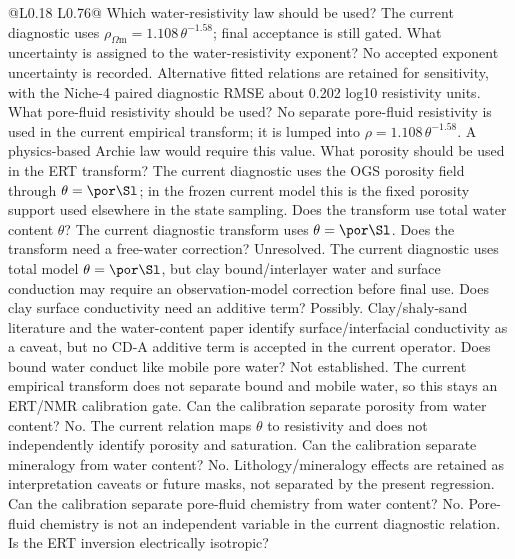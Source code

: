 \begin{longtable}{@{}L{0.18\textwidth} L{0.76\textwidth}@{}}
{ Which water-resistivity law should be used?}
{The current diagnostic uses \(\rho_{\Omega\mathrm{m}}=1.108\,\theta^{-1.58}\);
final acceptance is still gated.}
{ What uncertainty is assigned to the water-resistivity exponent?}
{No accepted exponent uncertainty is recorded.  Alternative fitted relations are
retained for sensitivity, with the Niche-4 paired diagnostic RMSE about 0.202 log10
resistivity units.}
{ What pore-fluid resistivity should be used?}
{No separate pore-fluid resistivity is used in the current empirical transform; it is
lumped into \(\rho=1.108\,\theta^{-1.58}\).  A physics-based Archie law would require
this value.}
{ What porosity should be used in the ERT transform?}
{The current diagnostic uses the OGS porosity field through
\(\theta=\por\Sl\); in the frozen current model this is the fixed porosity support
used elsewhere in the state sampling.}
{ Does the transform use total water content \(\theta\)?}
{The current diagnostic transform uses \(\theta=\por\Sl\).}
{ Does the transform need a free-water correction?}
{Unresolved.  The current diagnostic uses total model \(\theta=\por\Sl\), but clay
bound/interlayer water and surface conduction may require an observation-model
correction before final use.}
{ Does clay surface conductivity need an additive term?}
{Possibly.  Clay/shaly-sand literature and the water-content paper identify
surface/interfacial conductivity as a caveat, but no CD-A additive term is accepted
in the current operator.}
{ Does bound water conduct like mobile pore water?}
{Not established.  The current empirical transform does not separate bound and mobile
water, so this stays an ERT/NMR calibration gate.}
{ Can the calibration separate porosity from water content?}
{No.  The current relation maps \(\theta\) to resistivity and does not independently
identify porosity and saturation.}
{ Can the calibration separate mineralogy from water content?}
{No.  Lithology/mineralogy effects are retained as interpretation caveats or future
masks, not separated by the present regression.}
{ Can the calibration separate pore-fluid chemistry from water content?}
{No.  Pore-fluid chemistry is not an independent variable in the current diagnostic
relation.}
{ Is the ERT inversion electrically isotropic?}

\end{longtable}

